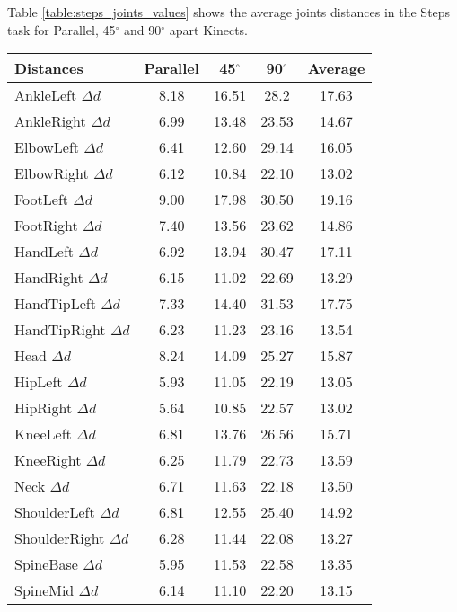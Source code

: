 Table \ref{table:steps_joints_values} shows the average joints distances in the Steps task for Parallel, 45$^{\circ}$ and 90$^{\circ}$ apart Kinects.

\begin{table}[!htb]
\centering
\begin{tabularx}{1.0\columnwidth}{||X c c c c||} 
 \hline
 \textbf{Distances} & \textbf{Parallel} & \textbf{45$^{\circ}$} & \textbf{90$^{\circ}$} & \textbf{Average} \\ [0.5ex] 
 \hline\hline
 AnkleLeft $\Delta d$ & 8.18 & 16.51 & 28.2 & 17.63 \\
 \hline
 AnkleRight $\Delta d$ & 6.99 & 13.48 & 23.53 & 14.67 \\
 \hline
 ElbowLeft $\Delta d$ & 6.41 & 12.60 & 29.14 & 16.05 \\
 \hline
 ElbowRight $\Delta d$ & 6.12 & 10.84 & 22.10 & 13.02 \\
 \hline
 FootLeft $\Delta d$ & 9.00 & 17.98 & 30.50 & 19.16 \\
 \hline
 FootRight $\Delta d$ & 7.40 & 13.56 & 23.62 & 14.86 \\
 \hline
 HandLeft $\Delta d$ & 6.92 & 13.94 & 30.47 & 17.11 \\
 \hline
 HandRight $\Delta d$ & 6.15 & 11.02 & 22.69 & 13.29 \\
 \hline
 HandTipLeft $\Delta d$ & 7.33 & 14.40 & 31.53 & 17.75 \\
 \hline
 HandTipRight $\Delta d$ & 6.23 & 11.23 & 23.16 & 13.54 \\
 \hline
 Head $\Delta d$ & 8.24 & 14.09 & 25.27 & 15.87 \\
 \hline
 HipLeft $\Delta d$ & 5.93 & 11.05 & 22.19 & 13.05 \\
 \hline
 HipRight $\Delta d$ & 5.64 & 10.85 & 22.57 & 13.02 \\
 \hline
 KneeLeft $\Delta d$ & 6.81 & 13.76 & 26.56 & 15.71 \\
 \hline
 KneeRight $\Delta d$ & 6.25 & 11.79 & 22.73 & 13.59 \\
 \hline
 Neck $\Delta d$ & 6.71 & 11.63 & 22.18 & 13.50 \\
 \hline
 ShoulderLeft $\Delta d$ & 6.81 & 12.55 & 25.40 & 14.92 \\
 \hline
 ShoulderRight $\Delta d$ & 6.28 & 11.44 & 22.08 & 13.27 \\
 \hline
 SpineBase $\Delta d$ & 5.95 & 11.53 & 22.58 & 13.35 \\
 \hline
 SpineMid $\Delta d$ & 6.14 & 11.10 & 22.20 & 13.15 \\

\end{tabularx}
\end{table}
